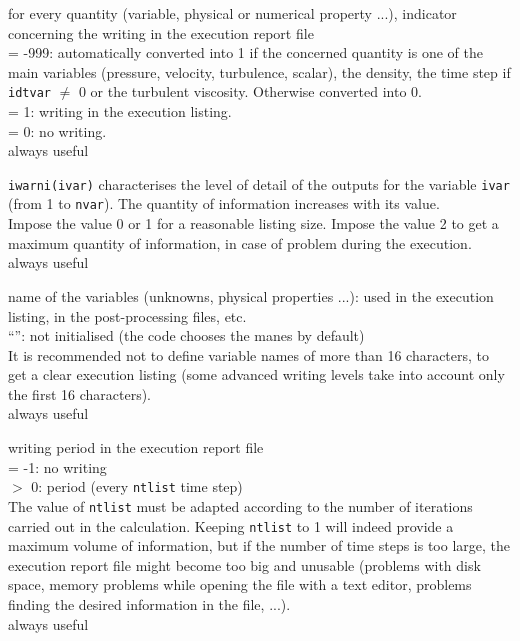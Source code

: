 {for every quantity (variable, physical or numerical property ...),
indicator concerning the writing in the execution report file \\
\hspace*{1.3cm}= -999: automatically converted into 1 if the concerned
quantity is one of the main variables (pressure, velocity, turbulence,
scalar), the density, the time step if {\tt idtvar} $\ne$ 0 or the turbulent
viscosity. Otherwise converted into 0.\\
\hspace*{1.3cm}= 1: writing in the execution listing.\\
\hspace*{1.3cm}= 0: no writing.\\
always useful}

{{\tt iwarni(ivar)} characterises the level of detail of the outputs for the
variable {\tt ivar} (from 1 to {\tt nvar}). The quantity of information
increases with its value.\\
Impose the value 0 or 1 for a reasonable listing size. Impose the value 2
to get a maximum quantity of information, in case of problem during the
execution.\\
always useful}

{name of the variables (unknowns, physical properties ...): used in the
execution listing, in the post-processing files, etc.\\
{``''}: not initialised (the code chooses the manes by default)\\
It is recommended not to define variable names of more than 16
characters, to get a clear execution listing (some advanced writing
levels take into account only the first 16 characters).\\
always useful}

{writing period in the execution report file\\
\hspace*{1.3cm}= -1: no writing\\
\hspace*{1.3cm}$>$ 0: period (every {\tt ntlist} time step)\\
The value of {\tt ntlist} must be adapted according to the number of iterations
carried out in the calculation. Keeping {\tt ntlist} to 1 will indeed provide
a maximum volume of information, but if the number of time steps is too large,
the execution report file might become too big and unusable
(problems with disk space, memory problems while opening the file with a text
editor, problems finding the desired information in the file, ...).\\
always useful}

